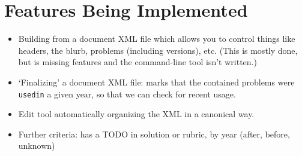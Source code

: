 \section{Features Being Implemented}
  \begin{itemize}
    \item Building from a document XML file which allows you to control things like headers, the blurb, problems (including versions), etc. (This is mostly done, but is missing features and the command-line tool isn't written.)
    \item `Finalizing' a document XML file: marks that the contained problems were \texttt{usedin} a given year, so that we can check for recent usage.
    \item Edit tool automatically organizing the XML in a canonical way.
    \item Further criteria: has a TODO in solution or rubric, by year (after, before, unknown)
  \end{itemize}